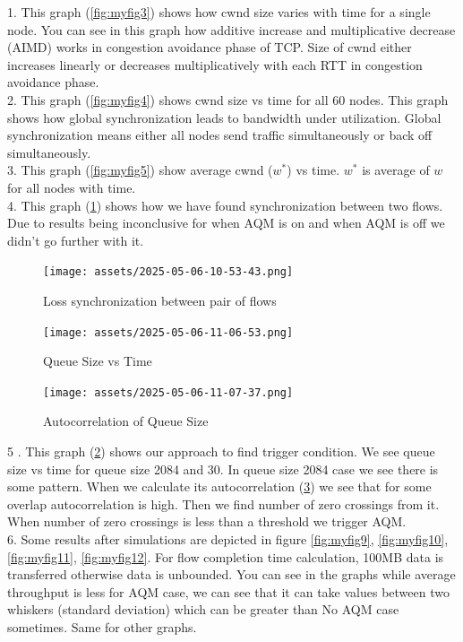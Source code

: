 1. This graph (\ref{fig:myfig3}) shows how cwnd size varies with time for a single node. You can see in this graph how additive increase and multiplicative decrease (AIMD) works in congestion avoidance phase of TCP. Size of cwnd either increases linearly or decreases multiplicatively with each RTT in congestion avoidance phase.\\ %
2. This graph (\ref{fig:myfig4}) shows cwnd size vs time for all 60 nodes. This graph shows how global synchronization leads to bandwidth under utilization. Global synchronization means either all nodes send traffic simultaneously or back off simultaneously. \\ %
3. This graph (\ref{fig:myfig5}) show average cwnd ($ w^* $) vs time. $ w^* $ is average of $ w $ for all nodes with time. \\ %
4. This graph (\ref{fig:myfig6}) shows how we have found synchronization between two flows. Due to results being inconclusive for when AQM is on and when AQM is off we didn't go further with it. \\ 

\begin{figure}[h]
  \centering
  \texttt{[image: assets/2025-05-06-10-53-43.png]}
  \caption{Loss synchronization between pair of flows}
  \label{fig:myfig6}
\end{figure}

\begin{figure}[h]
  \centering
  \texttt{[image: assets/2025-05-06-11-06-53.png]}
  \caption{Queue Size vs Time}
  \label{fig:myfig7}
\end{figure}

\begin{figure}[h]
  \centering
  \texttt{[image: assets/2025-05-06-11-07-37.png]}
  \caption{Autocorrelation of Queue Size}
  \label{fig:myfig8}
\end{figure}
5 . This graph (\ref{fig:myfig7}) shows our approach to find trigger condition. We see queue size vs time for queue size 2084 and 30. In queue size 2084 case we see there is some pattern. When we calculate its autocorrelation (\ref{fig:myfig8}) we see that for some overlap autocorrelation is high. Then we find number of zero crossings from it. When number of zero crossings is less than a threshold we trigger AQM. \\ 



6. Some results after simulations are depicted in figure \ref{fig:myfig9}, \ref{fig:myfig10}, \ref{fig:myfig11}, \ref{fig:myfig12}. For flow completion time calculation, 100MB data is transferred otherwise data is unbounded. You can see in the graphs while average throughput is less for AQM case, we can see that it can take values between two whiskers (standard deviation) which can be greater than No AQM case sometimes. Same for other graphs. \\ 

